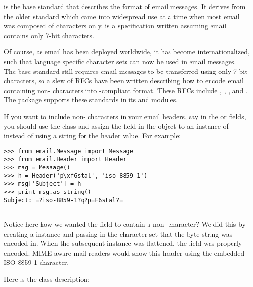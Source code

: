 
 is the base standard that describes the format of email
messages.  It derives from the older  standard which came
into widespread use at a time when most email was composed of \ASCII{}
characters only.   is a specification written assuming email
contains only 7-bit \ASCII{} characters.

Of course, as email has been deployed worldwide, it has become
internationalized, such that language specific character sets can now
be used in email messages.  The base standard still requires email
messages to be transferred using only 7-bit \ASCII{} characters, so a
slew of RFCs have been written describing how to encode email
containing non-\ASCII{} characters into -compliant format.
These RFCs include , , , and .
The  package supports these standards in its
 and  modules.

If you want to include non-\ASCII{} characters in your email headers,
say in the  or  fields, you should
use the  class and assign the field in the
 object to an instance of  instead of
using a string for the header value.  For example:

\begin{verbatim}
>>> from email.Message import Message
>>> from email.Header import Header
>>> msg = Message()
>>> h = Header('p\xf6stal', 'iso-8859-1')
>>> msg['Subject'] = h
>>> print msg.as_string()
Subject: =?iso-8859-1?q?p=F6stal?=


\end{verbatim}

Notice here how we wanted the  field to contain a
non-\ASCII{} character?  We did this by creating a 
instance and passing in the character set that the byte string was
encoded in.  When the subsequent  instance was
flattened, the  field was properly 
encoded.  MIME-aware mail readers would show this header using the
embedded ISO-8859-1 character.


Here is the  class description:

